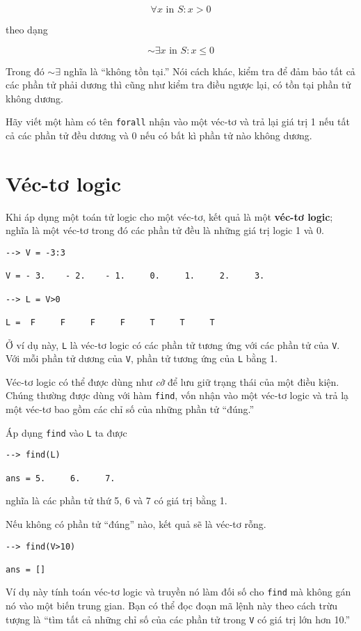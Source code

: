 \documentclass[12pt]{book}
\begin{document}
\[ \forall x \mbox{~in~} S: x>0 \]

\noindent theo dạng

\[ \sim \exists x \mbox{~in~} S: x \le 0 \]

Trong đó $\sim \exists$ nghĩa là ``không tồn tại.'' Nói cách khác,
kiểm tra để đảm bảo tất cả các phần tử phải dương thì cũng như
kiểm tra điều ngược lại, có tồn tại phần tử không dương.

\begin{ex}
Hãy viết một hàm có tên {\tt forall} nhận vào một véc-tơ và trả lại
giá trị 1 nếu tất cả các phần tử đều dương và 0 nếu có bất kì phần
tử nào không dương.
\end{ex}




\section{Véc-tơ logic}

Khi áp dụng một toán tử logic cho một véc-tơ, kết quả là một
{\bf véc-tơ logic}; nghĩa là một véc-tơ trong đó các phần tử
đều là những giá trị logic 1 và 0.

\begin{verbatim}
--> V = -3:3

V = - 3.    - 2.    - 1.     0.     1.     2.     3.

--> L = V>0

L =  F     F     F     F     T     T     T
\end{verbatim}
%
Ở ví dụ này, {\tt L} là véc-tơ logic có các phần tử tương ứng với
các phần tử của {\tt V}. Với mỗi phần tử dương của
{\tt V}, phần tử tương ứng của {\tt L} bằng 1.

Véc-tơ logic có thể được dùng như \emph{cờ} để lưu giữ trạng thái
của một điều kiện. Chúng thường được dùng với hàm {\tt find},
vốn nhận vào một véc-tơ logic và trả lạ một véc-tơ bao gồm các
chỉ số của những phần tử ``đúng.''

Áp dụng {\tt find} vào {\tt L} ta được

\begin{verbatim}
--> find(L)

ans = 5.     6.     7.
\end{verbatim}
%
\noindent nghĩa là các phần tử thứ 5, 6 và 7  có giá trị bằng 1.

Nếu không có phần tử ``đúng'' nào, kết quả sẽ là véc-tơ rỗng.

\begin{verbatim}
--> find(V>10)

ans = []
\end{verbatim}
%
Ví dụ này tính toán véc-tơ logic và truyền nó làm đối số cho
{\tt find} mà không gán nó vào một biến trung gian. Bạn có thể
đọc đoạn mã lệnh này theo cách trừu tượng là ``tìm tất cả
những chỉ số của các phần tử trong {\tt V} có giá trị lớn hơn 10.''
\end{document}
